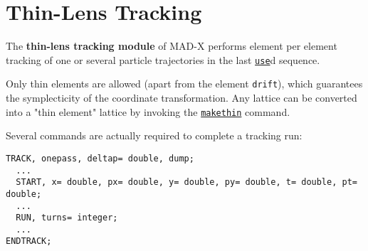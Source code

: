 
\chapter{Thin-Lens Tracking} %

The \textbf{thin-lens tracking module} of MAD-X performs element per
element tracking of one or several particle trajectories in the last
\href{../control/general.html#use}{\texttt{use}}d sequence.  
 

Only thin elements are allowed (apart from the element \texttt{drift}),
which guarantees the symplecticity of the coordinate transformation. Any
lattice can be converted into a "thin element" lattice by invoking the
\href{../makethin/makethin.html}{\texttt{makethin}} command. 

Several commands are actually required to complete a tracking run:

\begin{verbatim}
TRACK, onepass, deltap= double, dump; 
  ...
  START, x= double, px= double, y= double, py= double, t= double, pt= double;  
  ...
  RUN, turns= integer;
  ...
ENDTRACK;
\end{verbatim}



